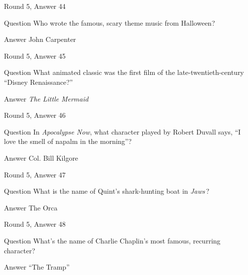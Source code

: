 \documentclass[11pt]{beamer}
\begin{document}
\begin{frame}[t]{Round 5, Answer 44}
\vspace{2em}
\begin{block}{Question}
Who wrote the famous, scary theme music from Halloween?
\end{block}
\pause{}
\begin{block}{Answer}
John Carpenter
\end{block}
\end{frame}
    

\begin{frame}[t]{Round 5, Answer 45}
\vspace{2em}
\begin{block}{Question}
What animated classic was the first film of the late-twentieth-century ``Disney Renaissance?''
\end{block}
\pause{}
\begin{block}{Answer}
\emph{The Little Mermaid}
\end{block}
\end{frame}
    

\begin{frame}[t]{Round 5, Answer 46}
\vspace{2em}
\begin{block}{Question}
In \emph{Apocalypse Now}, what character played by Robert Duvall says, ``I love the smell of napalm in the morning''?
\end{block}
\pause{}
\begin{block}{Answer}
Col. Bill Kilgore
\end{block}
\end{frame}
    

\begin{frame}[t]{Round 5, Answer 47}
\vspace{2em}
\begin{block}{Question}
What is the name of Quint's shark-hunting boat in \emph{Jaws}\,?
\end{block}
\pause{}
\begin{block}{Answer}
The Orca
\end{block}
\end{frame}
    

\begin{frame}[t]{Round 5, Answer 48}
\vspace{2em}
\begin{block}{Question}
What's the name of Charlie Chaplin's most famous, recurring character?
\end{block}
\pause{}
\begin{block}{Answer}
``The Tramp''
\end{block}
\end{frame}
    
\end{document}
